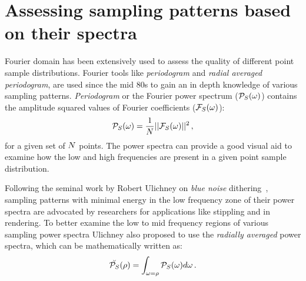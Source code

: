 %
%
%
\section{Assessing sampling patterns based on their spectra}
Fourier domain has been extensively used to assess the quality of different point sample distributions. 
Fourier tools like \emph{periodogram} and \emph{radial averaged periodogram}, are used since the mid 80s 
to gain an in depth knowledge of various sampling patterns. \emph{Periodogram} or the Fourier power 
spectrum ($\mathcal{P}_{S}(\mathbf{\omega})$) contains the amplitude squared values of Fourier coefficients ($\mathcal{F}_{S}(\mathbf{\omega})$):
%
\begin{align}
\mathcal{P}_{S}(\mathbf{\omega}) = \frac{1}{N}||\mathcal{F}_{S}(\mathbf{\omega})||^2 \,,
\end{align}
%
for a given set of $N$ points. 
The power spectra can provide a good visual aid to examine how the low and high frequencies are present
in a given point sample distribution. 

Following the seminal work by Robert Ulichney on \emph{blue noise} dithering~\cite{Ulichney:87:halftoning}, sampling patterns with minimal energy in the low frequency zone of their power spectra are advocated by researchers for applications like stippling and in rendering. To better examine the low to mid frequency regions 
of various sampling power spectra Ulichney also proposed to use the \emph{radially averaged} power spectra, which can be mathematically written as:
%
\begin{align}
\breve{\mathcal{P}_{S}}(\rho) = \int_{\mathbf{\omega} = \rho} \mathcal{P}_{S}(\mathbf{\omega}) d \mathbf{\omega} \,.
\end{align}
%


